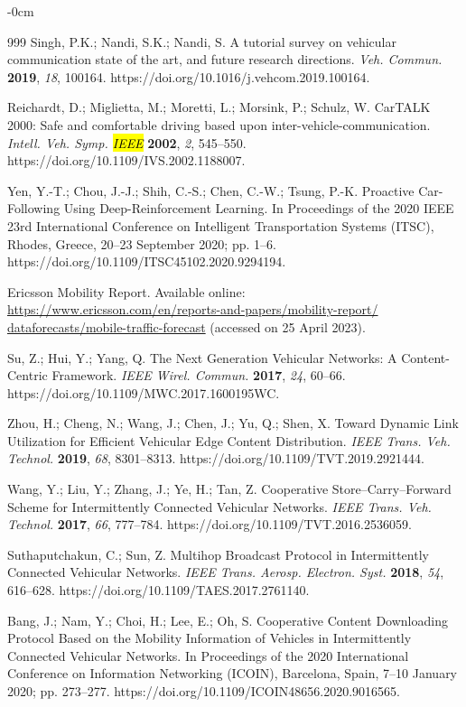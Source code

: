 \documentclass[sensors,aricle,accept,pdftex,moreauthors]{Definitions/mdpi}
\begin{document}
{\begin{adjustwidth}{-\extralength}{0cm}
\begin{thebibliography}{999}
 Singh, P.K.; Nandi, S.K.; Nandi, S. A tutorial survey on vehicular communication state of the art, and future research directions. {\em Veh. Commun.} {\bf 2019}, {\em 18}, 100164. https://doi.org/10.1016/j.vehcom.2019.100164.

 Reichardt, D.; Miglietta, M.; Moretti, L.; Morsink, P.; Schulz, W. CarTALK 2000: Safe and comfortable driving based upon inter-vehicle-communication. {\em Intell. Veh. Symp.   \hl{IEEE}} {\bf 2002}, {\em 2}, 545--550. https://doi.org/10.1109/IVS.2002.1188007.




 Yen, Y.-T.; Chou, J.-J.; Shih, C.-S.; Chen, C.-W.; Tsung, P.-K. Proactive Car-Following Using Deep-Reinforcement Learning. In Proceedings of the 2020 IEEE 23rd International Conference on Intelligent Transportation Systems (ITSC), Rhodes, Greece, 20--23 September 2020; pp. 1--6. https://doi.org/10.1109/ITSC45102.2020.9294194.

 Ericsson Mobility Report. Available online: \url{https://www.ericsson.com/en/reports-and-papers/mobility-report/}   \url{dataforecasts/mobile-traffic-forecast} (accessed on 25 April 2023).

 Su, Z.; Hui, Y.; Yang, Q. The Next Generation Vehicular Networks: A Content-Centric Framework. {\em IEEE Wirel. Commun.} {\bf 2017}, {\em 24}, 60--66. https://doi.org/10.1109/MWC.2017.1600195WC.

 Zhou, H.; Cheng, N.; Wang, J.; Chen, J.; Yu, Q.; Shen, X. Toward Dynamic Link Utilization for Efficient Vehicular Edge Content Distribution. {\em IEEE Trans. Veh. Technol.} {\bf 2019}, {\em 68}, 8301--8313. https://doi.org/10.1109/TVT.2019.2921444.

 Wang, Y.; Liu, Y.; Zhang, J.; Ye, H.; Tan, Z. Cooperative Store–Carry–Forward Scheme for Intermittently Connected Vehicular Networks. {\em IEEE Trans. Veh. Technol.} {\bf 2017}, {\em 66}, 777--784. https://doi.org/10.1109/TVT.2016.2536059.

 Suthaputchakun, C.; Sun, Z. Multihop Broadcast Protocol in Intermittently Connected Vehicular Networks. {\em IEEE Trans. Aerosp. Electron. Syst.} {\bf 2018}, {\em 54}, 616--628. https://doi.org/10.1109/TAES.2017.2761140.

 Bang, J.; Nam, Y.; Choi, H.; Lee, E.; Oh, S. Cooperative Content Downloading Protocol Based on the Mobility Information of Vehicles in Intermittently Connected Vehicular Networks. In Proceedings of the 2020 International Conference on Information Networking (ICOIN), Barcelona, Spain, 7--10 January 2020; pp. 273--277. https://doi.org/10.1109/ICOIN48656.2020.9016565.


\end{thebibliography}
\end{adjustwidth}}
\end{document}
